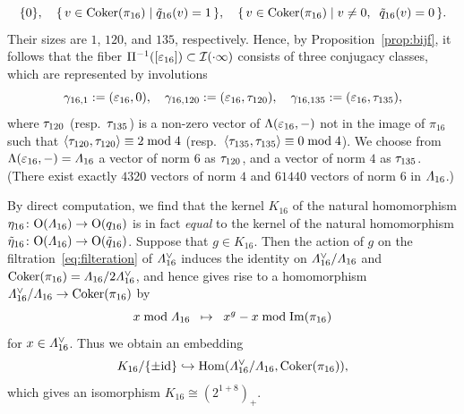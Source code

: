 \documentclass{amsart} %
\begin{document}
\[
\{0\},\quad 
\{\,{v \in\operatorname{Coker} (\pi_{16}) }\mid {\tilde{q}_{16}(v)=1} \,\},
\quad
\{\,{v \in\operatorname{Coker} (\pi_{16}) }\mid {v\ne 0, \;\; \tilde{q}_{16}(v)=0} \,\}.
\]
Their sizes are $1$, $120$, and $135$, respectively.
Hence, by Proposition~\ref{prop:bijf}, 
 it follows that the fiber $\Pi^{-1} ([\varepsilon_{16}])\subset \mathord{\mathcal{I}}(\cdot \infty)$ consists of three conjugacy classes,
 which are 
 represented by involutions
 \[
 \gamma_{16, 1}:=(\varepsilon_{16}, 0),
 \quad
 \gamma_{16, 120}:=(\varepsilon_{16},\tau_{120}),
 \quad
 \gamma_{16, 135}:=(\varepsilon_{16},\tau_{135}),
 \]
where $\tau_{120}$ (resp.~$ \tau_{135}$) is a non-zero vector of $\Lambda(\varepsilon_{16}, -)$ 
not in the image of $\pi_{16}$ 
such that
$\langle \tau_{120},\tau_{120} \rangle\equiv 2 \bmod 4$
 (resp.~$\langle \tau_{135},\tau_{135} \rangle\equiv 0 \bmod 4$).
 We choose from $\Lambda(\varepsilon_{16}, -)=\varLambda_{16}$ a vector of norm $6$ as $ \tau_{120}$,
 and a vector of norm $4$ as $ \tau_{135}$.
%
(There exist exactly $4320$ vectors of norm $4$ 
and $61440$ vectors of norm $6$ 
in $\varLambda_{16}$.)
%
\begin{remark}\label{remK16}
By direct computation, 
we find that 
the kernel $K_{16}$ of the natural homomorphism $\eta_{16}\colon\mathord{\mathrm{O}}(\varLambda_{16})\to \mathord{\mathrm{O}}(q_{16})$
is in fact \emph{equal} to the kernel of the natural homomorphism 
$\tilde{\eta}_{16}\colon \mathord{\mathrm{O}}(\varLambda_{16})\to \mathord{\mathrm{O}}(\tilde{q}_{16})$.
Suppose that $g\in K_{16}$.
Then 
the action of $g$ on
the filtration~\eqref{eq:filteration} of $\varLambda_{16}^{\vee}$
induces the identity on 
 $\varLambda_{16}^{\vee}/\varLambda_{16}$ and $\operatorname{Coker} (\pi_{16})=\varLambda_{16}/2\varLambda_{16}^{\vee}$, 
and hence gives rise to a homomorphism $\varLambda_{16}^{\vee}/\varLambda_{16}\to \operatorname{Coker} (\pi_{16})$
by 
\[ x \bmod \varLambda_{16} \;\;\mapsto \;\; x^g- x \bmod \operatorname{Im}(\pi_{16})
\]
for $x\in \varLambda_{16}^{\vee}$.
Thus we obtain an embedding
\[
K_{16}/\{\pm \mathord{\mathrm{id}}\}\hookrightarrow \operatorname{Hom}(\varLambda_{16}^{\vee}/\varLambda_{16}, \operatorname{Coker} (\pi_{16})), 
\]
which gives an isomorphism $K_{16}\cong (2^{1+8})_{+}$.
\end{remark}
%
%
\end{document}
